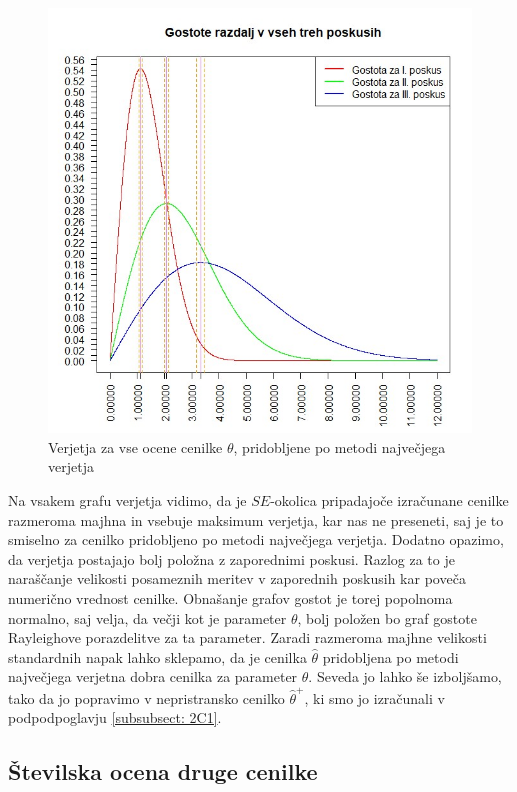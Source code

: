\documentclass[a4paper, 10pt]{article}
\begin{document}
	\begin{figure}[h!]
		\label{fig: 2Dplot4}
		\centering
		\includegraphics[scale = 0.35]{VerjetjeMNV4}
		\caption{Verjetja za vse ocene cenilke $\theta$, pridobljene po metodi največjega verjetja}
	\end{figure}
	
	Na vsakem grafu verjetja vidimo, da je $SE$-okolica pripadajoče izračunane cenilke razmeroma majhna in vsebuje maksimum verjetja, kar nas ne preseneti, saj je to smiselno za cenilko pridobljeno po metodi največjega verjetja. Dodatno opazimo, da verjetja postajajo bolj položna z zaporednimi poskusi. Razlog za to je naraščanje velikosti posameznih meritev v zaporednih poskusih kar poveča numerično vrednost cenilke. Obnašanje grafov gostot je torej popolnoma normalno, saj velja, da večji kot je parameter $\theta$, bolj položen bo graf gostote Rayleighove porazdelitve za ta parameter. 
	Zaradi razmeroma majhne velikosti standardnih napak lahko sklepamo, da je cenilka $\widehat{\theta}$ pridobljena po metodi največjega verjetna dobra cenilka za parameter $\theta$. Seveda jo lahko še izboljšamo, tako da jo popravimo v nepristransko cenilko $\widehat{\theta}^{+}$, ki smo jo izračunali v podpodpoglavju \ref{subsubsect: 2C1}.
	
	\subsection{Številska ocena druge cenilke} \label{subsect: 2E}
	
\end{document}
